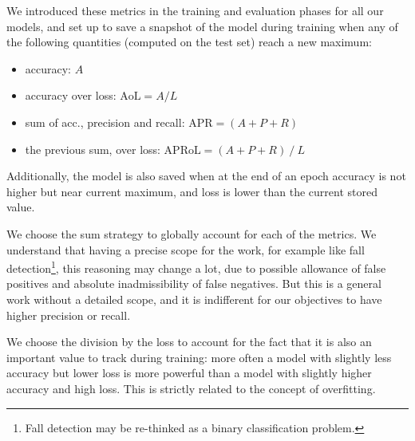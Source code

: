 We introduced these metrics in the training and evaluation phases for all our models, and set up to save a snapshot of the model during training when any of the following quantities (computed on the test set) reach a new maximum:
\begin{itemize}
    \item accuracy: $A$
    \item accuracy over loss: $\mathrm{AoL} = A/L$
    \item sum of acc., precision and recall: $\mathrm{APR} = (A+P+R)$
    \item the previous sum, over loss: $\mathrm{APRoL} = (A+P+R)\ /\ L$
\end{itemize}
Additionally, the model is also saved when at the end of an epoch accuracy is not higher but near current maximum, and loss is lower than the current stored value.

We choose the sum strategy to globally account for each of the metrics.
We understand that having a precise scope for the work, for example like fall detection\footnote{Fall detection may be re-thinked as a binary classification problem.}, this reasoning may change a lot, due to possible allowance of false positives and absolute inadmissibility of false negatives.
But this is a general work without a detailed scope, and it is indifferent for our objectives to have higher precision or recall.

We choose the division by the loss to account for the fact that it is also an important value to track during training: more often a model with slightly less accuracy but lower loss is more powerful than a model with slightly higher accuracy and high loss.
This is strictly related to the concept of overfitting.
